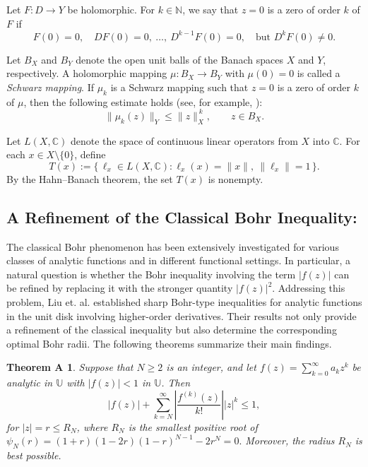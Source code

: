 \documentclass[11pt, reqno]{amsart}
\newtheorem*{theoA}{Theorem A}
\newtheorem*{cor A}{Corollary A}
\newtheorem*{cor B}{Corollary B}
\numberwithin{equation}{section}
\begin{document}
Let $F\colon D\to Y$ be holomorphic. For $k\in\mathbb{N}$, we say that $z=0$ is a zero of order $k$ of $F$
if
\[
F(0)=0,\quad DF(0)=0,\ \ldots,\ D^{k-1}F(0)=0,\quad \text{but } D^kF(0)\neq 0.
\]

Let $B_X$ and $B_Y$ denote the open unit balls of the Banach spaces $X$ and $Y$, respectively.
A holomorphic mapping $\mu\colon B_X\to B_Y$ with $\mu(0)=0$ is called a \emph{Schwarz mapping}.
If $\mu_k$ is a Schwarz mapping such that $z=0$ is a zero of order $k$ of $\mu$, then the following estimate holds
(see, for example, \cite[Lemma~6.1.28]{GK2003}):
\begin{equation}
\|\mu_k(z)\|_Y \le \|z\|_X^{\,k}, \qquad z\in B_X.
\label{eq:Schwarz}
\end{equation}

Let $L(X,\mathbb{C})$ denote the space of continuous linear operators from $X$ into $\mathbb{C}$.
For each $x\in X\setminus\{0\}$, define
\[
T(x):=\{\,\ell_x\in L(X,\mathbb{C}) : \ell_x(x)=\|x\|,\ \|\ell_x\|=1\,\}.
\]
By the Hahn--Banach theorem, the set $T(x)$ is nonempty.

\subsection{{\bf A Refinement of the Classical Bohr Inequality:}}
The classical Bohr phenomenon has been extensively investigated for various classes of analytic functions and in different functional settings. In particular, a natural question is whether the Bohr inequality involving the term $|f(z)|$ can be refined by replacing it with the stronger quantity $|f(z)|^2$. Addressing this problem, Liu et. al. \cite{LSX2018} established sharp Bohr-type inequalities for analytic functions in the unit disk involving higher-order derivatives. Their results not only provide a refinement of the classical inequality but also determine the corresponding optimal Bohr radii. The following theorems summarize their main findings.
\begin{theoA}\cite[Theorem 2.2]{LSX2018}
Suppose that $N\geq 2$ is an integer, and let $f(z)=\sum_{k=0}^{\infty} a_k z^k$ be analytic in $\mathbb{U}$ with $|f(z)|<1$ in $\mathbb{U}$. Then
\[
|f(z)|+\sum_{k=N}^{\infty}\left|\frac{f^{(k)}(z)}{k!}\right||z|^k\leq 1,
\]
for $|z|=r\leq R_N$, where $R_N$ is the smallest positive root of $\psi_N(r)=(1+r)(1-2r)(1-r)^{N-1}-2r^N=0.$
Moreover, the radius $R_N$ is best possible.
\end{theoA}
\end{document}
